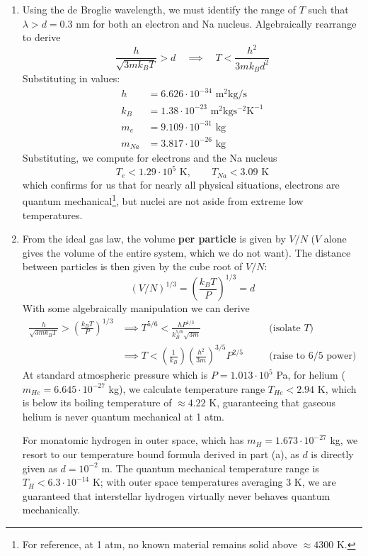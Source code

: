 \documentclass[a4paper]{article}
\begin{document}
\begin{enumerate}[label=(\alph*)]
	\item Using the de Broglie wavelength, we must identify the range of \( T \) such that \( \lambda > d = 0.3 \) nm for both an electron and Na nucleus. Algebraically rearrange to derive
	\[
		\frac{h}{\sqrt{3mk_{B}T}} > d \quad \implies \quad T < \frac{h^{2}}{3mk_{B}d^{2}}
	\]
	Substituting in values:
	\begin{align*}
		h & = 6.626 \cdot 10^{-34} \text{ m}^{2} \text{kg} / \text{s} \\
		k_{B} & = 1.38 \cdot 10^{-23} \text{ m}^{2}\text{kg}\text{s}^{-2}\text{K}^{-1} \\
		m_{e} & = 9.109 \cdot 10^{-31} \text{ kg} \\ 
		m_{Na} & = 3.817 \cdot 10^{-26} \text{ kg}
	\end{align*}
	Substituting, we compute for electrons and the Na nucleus
	\[
		T_{e} < 1.29 \cdot 10^{5} \text{ K}, \qquad T_{Na} < 3.09 \text{ K}
	\]
	which confirms for us that for nearly all physical situations, electrons are quantum mechanical\footnote{For reference, at 1 atm, no known material remains solid above \( \approx 4300 \) K.}, but nuclei are not aside from extreme low temperatures.
	\item From the ideal gas law, the volume \textbf{per particle} is given by \( V / N \) (\( V \) alone gives the volume of the entire system, which we do not want). The distance between particles is then given by the cube root of \( V / N \):
	\[
		\!\left( V / N \right)^{1/3} = \!\left( \frac{k_{B}T}{P} \right)^{1/3} = d
	\]
	With some algebraically manipulation we can derive
	\begin{align*}
		\frac{h}{\sqrt{3mk_{B}T}} > \!\left( \frac{k_{B}T}{P} \right)^{1/3} & \implies T^{5/6} < \frac{hP^{1/3}}{k_{B}^{5/6}\sqrt{3m}} & & \quad \text{(isolate } T ) \\
										    & \implies T < \!\left( \frac{1}{k_{B}} \right)\!\left( \frac{h^{2}}{3m} \right)^{3/5}P^{2/5} & & \quad \text{(raise to } 6/5 \text{ power)}
	\end{align*}
	At standard atmospheric pressure which is \( P = 1.013 \cdot 10^{5} \) Pa, for helium (\( m_{He} = 6.645 \cdot 10^{-27} \) kg), we calculate temperature range \( T_{He} < 2.94 \) K, which is below its boiling temperature of \( \approx 4.22 \) K, guaranteeing that gaseous helium is never quantum mechanical at 1 atm. 

	For monatomic hydrogen in outer space, which has \( m_{H} = 1.673 \cdot 10^{-27} \) kg, we resort to our temperature bound formula derived in part (a), as \( d \) is directly given as \( d = 10^{-2} \) m. The quantum mechanical temperature range is \( T_{H} < 6.3 \cdot 10^{-14} \) K; with outer space temperatures averaging 3 K, we are guaranteed that interstellar hydrogen virtually never behaves quantum mechanically.
\end{enumerate}
\end{document}
